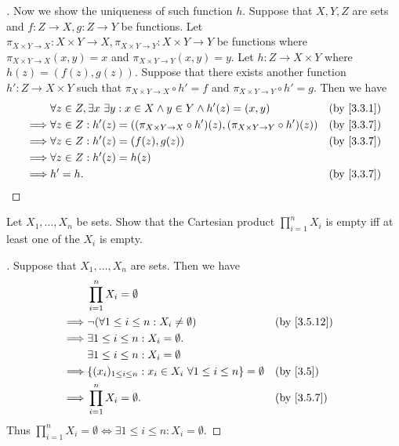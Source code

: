 \begin{proof}[]
	Now we show the uniqueness of such function \(h\).
	Suppose that \(X, Y, Z\) are sets and \(f : Z \to X, g : Z \to Y\) be functions.
	Let \(\pi_{X \times Y \to X} : X \times Y \to X, \pi_{X \times Y \to Y} : X \times Y \to Y\) be functions where \(\pi_{X \times Y \to X}(x, y) = x\) and \(\pi_{X \times Y \to Y}(x, y) = y\).
	Let \(h : Z \to X \times Y\) where \(h(z) = (f(z), g(z))\).
	Suppose that there exists another function \(h' : Z \to X \times Y\) such that \(\pi_{X \times Y \to X} \circ h' = f\) and \(\pi_{X \times Y \to Y} \circ h' = g\).
	Then we have
	\begin{align*}
		         & \forall z \in Z, \exists x \ \exists y : x \in X \land y \in Y \land h'(z) = (x, y)                    &  & \by{3.3.1} \\
		\implies & \forall z \in Z : h'(z) = ((\pi_{X \times Y \to X} \circ h')(z), (\pi_{X \times Y \to Y} \circ h')(z)) &  & \by{3.3.7} \\
		\implies & \forall z \in Z : h'(z) = (f(z), g(z))                                                                 &  & \by{3.3.7} \\
		\implies & \forall z \in Z : h'(z) = h(z)                                                                                         \\
		\implies & h' = h.                                                                                                &  & \by{3.3.7}
	\end{align*}
\end{proof}

\begin{ex}\label{ex:3.5.8}
	Let \(X_1, \dots, X_n\) be sets.
	Show that the Cartesian product \(\prod_{i = 1}^n X_i\) is empty iff at least one of the \(X_i\) is empty.
\end{ex}

\begin{proof}[]
	Suppose that \(X_1, \dots, X_n\) are sets.
	Then we have
	\begin{align*}
		         & \prod_{i = 1}^n X_i = \emptyset                                                                    \\
		\implies & \lnot (\forall 1 \leq i \leq n : X_i \neq \emptyset)                              &  & \by{3.5.12} \\
		\implies & \exists 1 \leq i \leq n : X_i = \emptyset.                                                         \\
		         & \exists 1 \leq i \leq n : X_i = \emptyset                                                          \\
		\implies & \set{(x_i)_{1 \leq i \leq n} : x_i \in X_i \ \forall 1 \leq i \leq n} = \emptyset &  & \by{3.5}    \\
		\implies & \prod_{i = 1}^n X_i = \emptyset.                                                  &  & \by{3.5.7}
	\end{align*}
	Thus \(\prod_{i = 1}^n X_i = \emptyset \iff \exists 1 \leq i \leq n : X_i = \emptyset\).
\end{proof}

